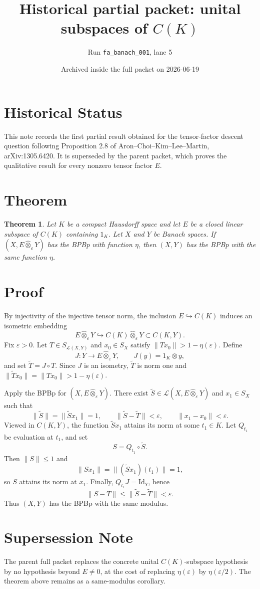 \documentclass[11pt]{article}
\title{Historical partial packet: unital subspaces of \(C(K)\)}
\author{Run \texttt{fa\_banach\_001}, lane 5}
\date{Archived inside the full packet on 2026-06-19}
\newtheorem{theorem}{Theorem}
\newcommand{\ot}{\widehat{\otimes}_{\varepsilon}}
\begin{document}
\maketitle

\section*{Historical Status}

This note records the first partial result obtained for the tensor-factor
descent question following Proposition 2.8 of Aron--Choi--Kim--Lee--Martin,
arXiv:1305.6420.  It is superseded by the parent packet, which proves the
qualitative result for every nonzero tensor factor \(E\).

\section*{Theorem}

\begin{theorem}
Let \(K\) be a compact Hausdorff space and let \(E\) be a closed linear
subspace of \(C(K)\) containing \(1_K\).  Let \(X\) and \(Y\) be Banach spaces.
If \((X,E\ot Y)\) has the BPBp with function \(\eta\), then \((X,Y)\) has the
BPBp with the same function \(\eta\).
\end{theorem}

\section*{Proof}

By injectivity of the injective tensor norm, the inclusion \(E\hookrightarrow
C(K)\) induces an isometric embedding
\[
 E\ot Y\hookrightarrow C(K)\ot Y\subset C(K,Y).
\]
Fix \(\varepsilon>0\).  Let \(T\in S_{\mathcal L(X,Y)}\) and \(x_0\in S_X\)
satisfy \(\|Tx_0\|>1-\eta(\varepsilon)\).  Define
\[
 J:Y\to E\ot Y,\qquad J(y)=1_K\otimes y,
\]
and set \(\widetilde T=J\circ T\).  Since \(J\) is an isometry,
\(\widetilde T\) is norm one and
\(\|\widetilde T x_0\|=\|Tx_0\|>1-\eta(\varepsilon)\).

Apply the BPBp for \((X,E\ot Y)\).  There exist
\(\widetilde S\in\mathcal L(X,E\ot Y)\) and \(x_1\in S_X\) such that
\[
 \|\widetilde S\|=\|\widetilde Sx_1\|=1,\qquad
 \|\widetilde S-\widetilde T\|<\varepsilon,\qquad
 \|x_1-x_0\|<\varepsilon .
\]
Viewed in \(C(K,Y)\), the function \(\widetilde Sx_1\) attains its norm at
some \(t_1\in K\).  Let \(Q_{t_1}\) be evaluation at \(t_1\), and set
\[
 S=Q_{t_1}\circ\widetilde S.
\]
Then \(\|S\|\leq 1\) and
\[
 \|Sx_1\|=\|(\widetilde Sx_1)(t_1)\|=1,
\]
so \(S\) attains its norm at \(x_1\).  Finally, \(Q_{t_1}J=\mathrm{Id}_Y\),
hence
\[
 \|S-T\|\leq\|\widetilde S-\widetilde T\|<\varepsilon .
\]
Thus \((X,Y)\) has the BPBp with the same modulus.

\section*{Supersession Note}

The parent full packet replaces the concrete unital \(C(K)\)-subspace
hypothesis by no hypothesis beyond \(E\neq 0\), at the cost of replacing
\(\eta(\varepsilon)\) by \(\eta(\varepsilon/2)\).  The theorem above remains
as a same-modulus corollary.
\end{document}
